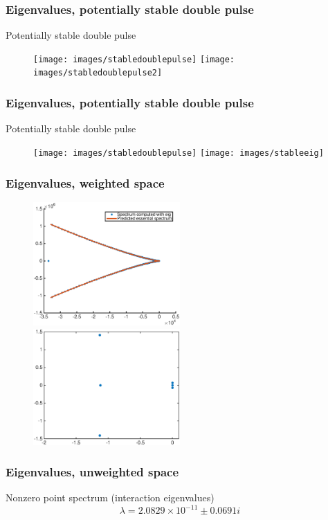 \documentclass[16pt]{beamer}
\begin{document}
\begin{frame}
	\frametitle{Eigenvalues, potentially stable double pulse}
	Potentially stable double pulse
	\begin{figure}
   		\texttt{[image: images/stabledoublepulse]}
   		\hfill
   		\texttt{[image: images/stabledoublepulse2]}
	\end{figure}
\end{frame}

\begin{frame}
	\frametitle{Eigenvalues, potentially stable double pulse}
	Potentially stable double pulse
	\begin{figure}
   		\texttt{[image: images/stabledoublepulse]}
   		\hfill
   		\texttt{[image: images/stableeig]}
	\end{figure}
\end{frame}

\begin{frame}
	\frametitle{Eigenvalues, weighted space}
	\begin{figure}
   		\includegraphics[width=0.5\textwidth]{images/stableeigweighted1}
   		\hfill
   		\includegraphics[width=0.5\textwidth]{images/stableeigweighted2}
	\end{figure}
\end{frame}

\begin{frame}
	\frametitle{Eigenvalues, unweighted space}

	\begin{block}{Nonzero point spectrum (interaction eigenvalues)}
		\[ \lambda = 2.0829 \times 10^{-11} \pm 0.0691i \]
	\end{block}
\end{frame}
\end{document}
